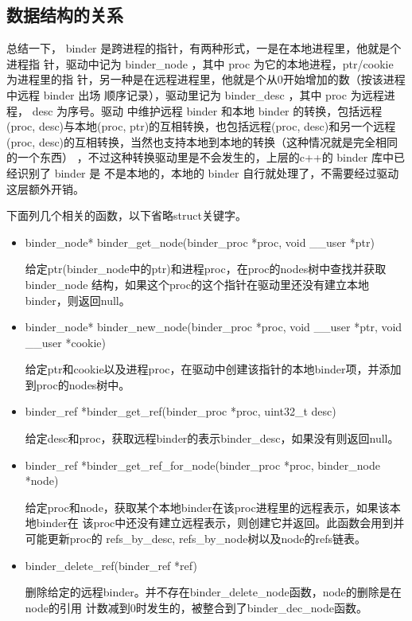 \documentclass[a4paper,11pt]{article}
\begin{document}
\subsection{数据结构的关系}
总结一下， binder 是跨进程的指针，有两种形式，一是在本地进程里，他就是个进程指
针，驱动中记为 binder_node ，其中 proc 为它的本地进程，ptr/cookie 为进程里的指
针，另一种是在远程进程里，他就是个从0开始增加的数（按该进程中远程 binder 出场
顺序记录），驱动里记为 binder_desc ，其中 proc 为远程进程， desc 为序号。驱动
中维护远程 binder 和本地 binder 的转换，包括远程(proc, desc)与本地(proc,
ptr)的互相转换，也包括远程(proc, desc)和另一个远程(proc,
desc)的互相转换，当然也支持本地到本地的转换（这种情况就是完全相同的一个东西）
，不过这种转换驱动里是不会发生的，上层的c++的 binder 库中已经识别了 binder 是
不是本地的，本地的 binder 自行就处理了，不需要经过驱动这层额外开销。


下面列几个相关的函数，以下省略struct关键字。
\begin{itemize}
    \item binder_node* binder_get_node(binder_proc *proc, void __user *ptr)

        给定ptr(binder_node中的ptr)和进程proc，在proc的nodes树中查找并获取binder_node
        结构，如果这个proc的这个指针在驱动里还没有建立本地binder，则返回null。

    \item binder_node* binder_new_node(binder_proc *proc, void __user *ptr, void __user *cookie)

        给定ptr和cookie以及进程proc，在驱动中创建该指针的本地binder项，并添加到proc的nodes树中。

    \item binder_ref *binder_get_ref(binder_proc *proc, uint32_t desc)

        给定desc和proc，获取远程binder的表示binder_desc，如果没有则返回null。

    \item binder_ref *binder_get_ref_for_node(binder_proc *proc, binder_node *node)

        给定proc和node，获取某个本地binder在该proc进程里的远程表示，如果该本地binder在
        该proc中还没有建立远程表示，则创建它并返回。此函数会用到并可能更新proc的
        refs_by_desc, refs_by_node树以及node的refs链表。

    \item binder_delete_ref(binder_ref *ref)

        删除给定的远程binder。并不存在binder_delete_node函数，node的删除是在node的引用
        计数减到0时发生的，被整合到了binder_dec_node函数。
\end{itemize}
\end{document}
